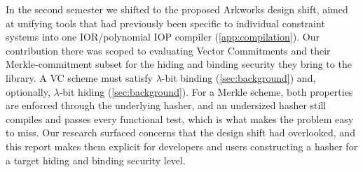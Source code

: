 In the second semester we shifted to the proposed Arkworks design shift, aimed at
unifying tools that had previously been specific to individual constraint systems into
one IOR/polynomial IOP compiler (\cref{app:compilation}).  Our contribution there was scoped
to evaluating Vector Commitments and their Merkle-commitment subset for the hiding and
binding security they bring to the library.  A VC scheme must satisfy $\lambda$-bit
binding (\cref{sec:background}) and, optionally, $\lambda$-bit hiding
(\cref{sec:background}).  For a Merkle scheme, both properties are enforced through the
underlying hasher, and an undersized hasher still compiles and passes every functional
test, which is what makes the problem easy to miss.  Our research surfaced concerns that
the design shift had overlooked, and this report makes them explicit for developers and
users constructing a hasher for a target hiding and binding security level.
